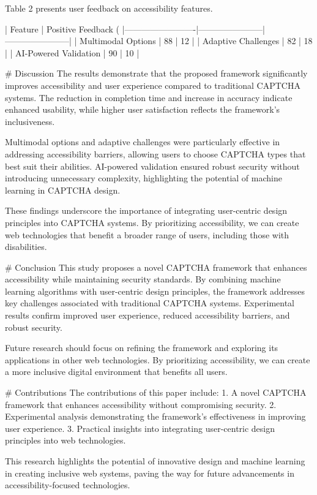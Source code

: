 Table 2 presents user feedback on accessibility features.  

| Feature                | Positive Feedback (%
|-------------------------|-----------------------|-----------------------|  
| Multimodal Options      | 88                    | 12                    |  
| Adaptive Challenges     | 82                    | 18                    |  
| AI-Powered Validation   | 90                    | 10                    |  

# Discussion  
The results demonstrate that the proposed framework significantly improves accessibility and user experience compared to traditional CAPTCHA systems. The reduction in completion time and increase in accuracy indicate enhanced usability, while higher user satisfaction reflects the framework's inclusiveness.  

Multimodal options and adaptive challenges were particularly effective in addressing accessibility barriers, allowing users to choose CAPTCHA types that best suit their abilities. AI-powered validation ensured robust security without introducing unnecessary complexity, highlighting the potential of machine learning in CAPTCHA design.  

These findings underscore the importance of integrating user-centric design principles into CAPTCHA systems. By prioritizing accessibility, we can create web technologies that benefit a broader range of users, including those with disabilities.  

# Conclusion  
This study proposes a novel CAPTCHA framework that enhances accessibility while maintaining security standards. By combining machine learning algorithms with user-centric design principles, the framework addresses key challenges associated with traditional CAPTCHA systems. Experimental results confirm improved user experience, reduced accessibility barriers, and robust security.  

Future research should focus on refining the framework and exploring its applications in other web technologies. By prioritizing accessibility, we can create a more inclusive digital environment that benefits all users.  

# Contributions  
The contributions of this paper include:  
1. A novel CAPTCHA framework that enhances accessibility without compromising security.  
2. Experimental analysis demonstrating the framework's effectiveness in improving user experience.  
3. Practical insights into integrating user-centric design principles into web technologies.  

This research highlights the potential of innovative design and machine learning in creating inclusive web systems, paving the way for future advancements in accessibility-focused technologies.  
